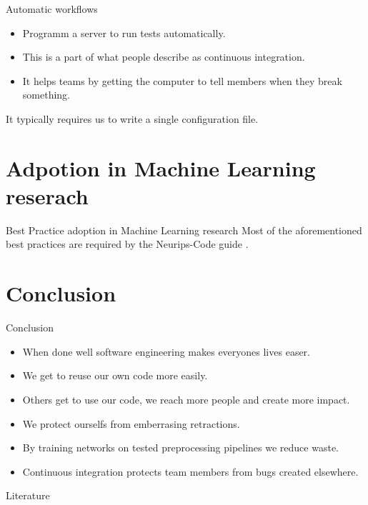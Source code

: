 \documentclass{beamer}
\begin{document}
    \begin{frame}{Automatic workflows}
      \begin{itemize}
        \item Programm a server to run tests automatically.
        \item This is a part of what people describe as continuous integration.
        \item It helps teams by getting the computer to tell members when they break something.
      \end{itemize}
      It typically requires us to write a single configuration file.
    \end{frame}

    \section{Adpotion in Machine Learning reserach}
    \begin{frame}{Best Practice adoption in Machine Learning research}
      Most of the aforementioned best practices are required by the Neurips-Code guide \cite{NeuripsCodeguide}.
      \begin{figure}
        \centering
        
        
        
        
      \end{figure}
    \end{frame}


    \section{Conclusion}
    \begin{frame}{Conclusion}
        \begin{itemize}
            \item When done well software engineering makes everyones lives easer.
            \item We get to reuse our own code more easily.
            \item Others get to use our code, we reach more people and create more impact.
            \item We protect ourselfs from emberrasing retractions.
            \item By training networks on tested preprocessing pipelines we reduce waste.
            \item Continuous integration protects team members from bugs created elsewhere.
        \end{itemize}
    \end{frame}

    \begin{frame}[allowframebreaks]{Literature}
      \printbibliography
    \end{frame}
\end{document}

